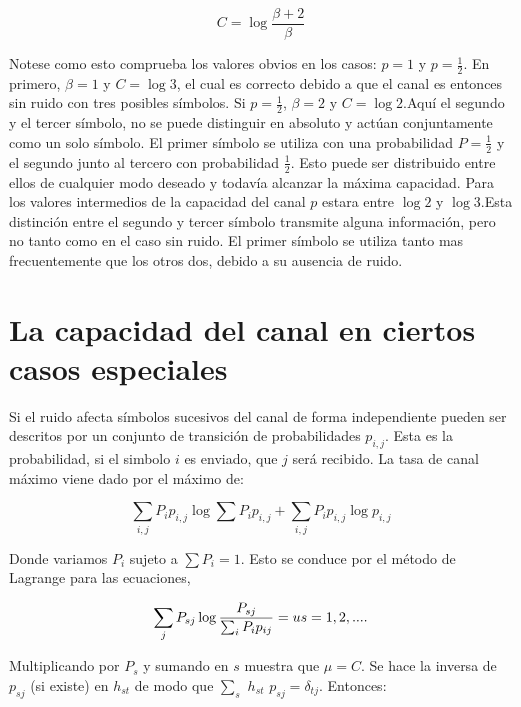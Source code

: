 \begin{equation}
  C = \log{\frac{\beta + 2}{\beta}}
\end{equation}

Notese como esto comprueba los valores obvios en los casos: $p = 1$ y $p = \frac{1}{2}$. En primero, $\beta = 1$ y $C = \log{3}$, 
el cual es correcto debido a que el canal es entonces sin ruido con tres posibles s\'imbolos. Si $p = \frac{1}{2}$, $\beta = 2$ y 
$C = \log{2}$.Aqu\'i el segundo y el tercer s\'imbolo, no se puede distinguir en absoluto y act\'uan conjuntamente como un solo 
s\'imbolo. El primer s\'imbolo se utiliza con una probabilidad $P = \frac{1}{2}$  y el segundo junto al tercero con probabilidad $\frac{1}{2}$. Esto puede ser distribuido entre ellos de cualquier modo deseado y todav\'ia alcanzar la m\'axima capacidad.
Para los valores intermedios de la capacidad del canal $p$ estara entre $\log{2}$ y $\log{3}$.Esta distinci\'on 
entre el segundo y tercer s\'imbolo transmite alguna informaci\'on, pero no tanto como en el caso sin ruido.
El primer s\'imbolo se utiliza tanto mas frecuentemente que los otros dos, debido a su ausencia de ruido.

\clearpage

\chapter{La capacidad del canal en ciertos casos especiales}
\label{sec:16}

Si el ruido afecta s\'imbolos sucesivos del canal de forma
independiente pueden ser descritos por un conjunto de transici\'on de
probabilidades $p_{i,j}$. Esta es la probabilidad, si el simbolo $i$ es
enviado, que $j$ ser\'{a} recibido. La tasa de canal m\'aximo viene dado
por el m\'aximo de:

\begin{equation}
  \sum_{i,j}P_i p_{i,j} \log{\sum{P_i p_{i,j}}} + \sum_{i,j}P_i p_{i,j}\log{p_{i,j}}
\end{equation}
 
Donde variamos $P_i$ sujeto a $ \sum P_i = 1$. Esto se conduce por el m\'etodo de Lagrange para las ecuaciones,

\begin{equation}
\sum_{j}P_{sj} \log{\frac{P_{sj}}{\sum_{i} P_i p_{ij} }} = u \\
s = 1,2,....
\end{equation}

Multiplicando por $P_s$ y sumando en $s$ muestra que $\mu = C$. Se hace la inversa de $p_{sj}$ (si existe) en $h_{st}$  de modo que 
$\sum_{s}$ $h_{st}$ $p_{sj} = \delta_{tj}$. Entonces: 

